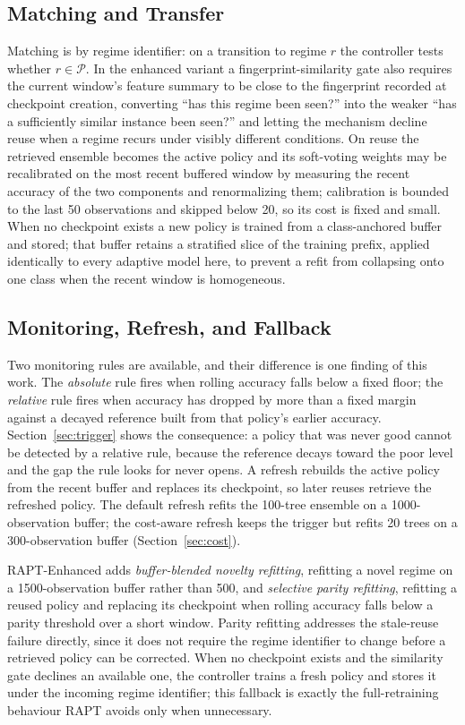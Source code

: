 \documentclass[conference]{IEEEtran}
\begin{document}
\subsection{Matching and Transfer}
Matching is by regime identifier: on a transition to regime $r$ the controller tests
whether $r \in \mathcal{P}$. In the enhanced variant a fingerprint-similarity gate
also requires the current window's feature summary to be close to the fingerprint
recorded at checkpoint creation, converting ``has this regime been seen?'' into the
weaker ``has a sufficiently similar instance been seen?'' and letting the mechanism
decline reuse when a regime recurs under visibly different conditions. On reuse the
retrieved ensemble becomes the active policy and its soft-voting weights may be
recalibrated on the most recent buffered window by measuring the recent accuracy of
the two components and renormalizing them; calibration is bounded to the last 50
observations and skipped below 20, so its cost is fixed and small. When no checkpoint
exists a new policy is trained from a class-anchored buffer and stored; that buffer
retains a stratified slice of the training prefix, applied identically to every
adaptive model here, to prevent a refit from collapsing onto one class when the recent
window is homogeneous.

\subsection{Monitoring, Refresh, and Fallback}
Two monitoring rules are available, and their difference is one finding of this work.
The \emph{absolute} rule fires when rolling accuracy falls below a fixed floor; the
\emph{relative} rule fires when accuracy has dropped by more than a fixed margin
against a decayed reference built from that policy's earlier accuracy.
Section~\ref{sec:trigger} shows the consequence: a policy that was never good cannot
be detected by a relative rule, because the reference decays toward the poor level and
the gap the rule looks for never opens. A refresh rebuilds the active policy from the
recent buffer and replaces its checkpoint, so later reuses retrieve the refreshed
policy. The default refresh refits the 100-tree ensemble on a 1000-observation buffer;
the cost-aware refresh keeps the trigger but refits 20 trees on a 300-observation
buffer (Section~\ref{sec:cost}).

RAPT-Enhanced adds \emph{buffer-blended novelty refitting}, refitting a novel regime
on a 1500-observation buffer rather than 500, and \emph{selective parity refitting},
refitting a reused policy and replacing its checkpoint when rolling accuracy falls
below a parity threshold over a short window. Parity refitting addresses the
stale-reuse failure directly, since it does not require the regime identifier to
change before a retrieved policy can be corrected. When no checkpoint exists and the
similarity gate declines an available one, the controller trains a fresh policy and
stores it under the incoming regime identifier; this fallback is exactly the
full-retraining behaviour RAPT avoids only when unnecessary.
\end{document}
